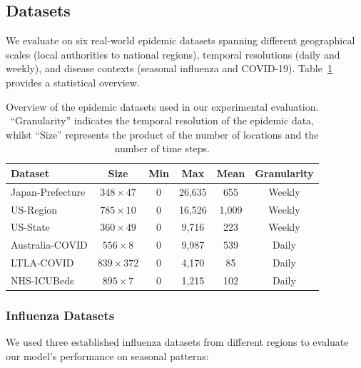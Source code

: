 \documentclass[a4paper,fleqn]{cas-dc}
\begin{document}
\subsection{Datasets}
\label{sec:datasets}

We evaluate on six real-world epidemic datasets spanning different geographical scales (local authorities to national regions), temporal resolutions (daily and weekly), and disease contexts (seasonal influenza and COVID-19). Table~\ref{tab:datasets} provides a statistical overview.

\begin{table}[!htbp]
\centering
\caption{Overview of the epidemic datasets used in our experimental evaluation. ``Granularity'' indicates the temporal resolution of the epidemic data, whilst ``Size'' represents the product of the number of locations and the number of time steps.}
\label{tab:datasets}
\begin{tabular}{lccccc}
\hline
\textbf{Dataset} & \textbf{Size} & \textbf{Min} & \textbf{Max} & \textbf{Mean} & \textbf{Granularity} \\
\hline
Japan-Prefecture & $348 \times 47$ & 0 & 26,635 & 655 & Weekly \\
US-Region & $785 \times 10$ & 0 & 16,526 & 1,009 & Weekly \\
US-State & $360 \times 49$ & 0 & 9,716 & 223 & Weekly \\
Australia-COVID & $556 \times 8$ & 0 & 9,987 & 539 & Daily \\
LTLA-COVID & $839 \times 372$ & 0 & 4,170 & 85 & Daily \\
NHS-ICUBeds & $895 \times 7$ & 0 & 1,215 & 102 & Daily \\
\hline
\end{tabular}
\end{table}

\subsubsection{Influenza Datasets}
We used three established influenza datasets from different regions to evaluate our model's performance on seasonal patterns:
\end{document}
